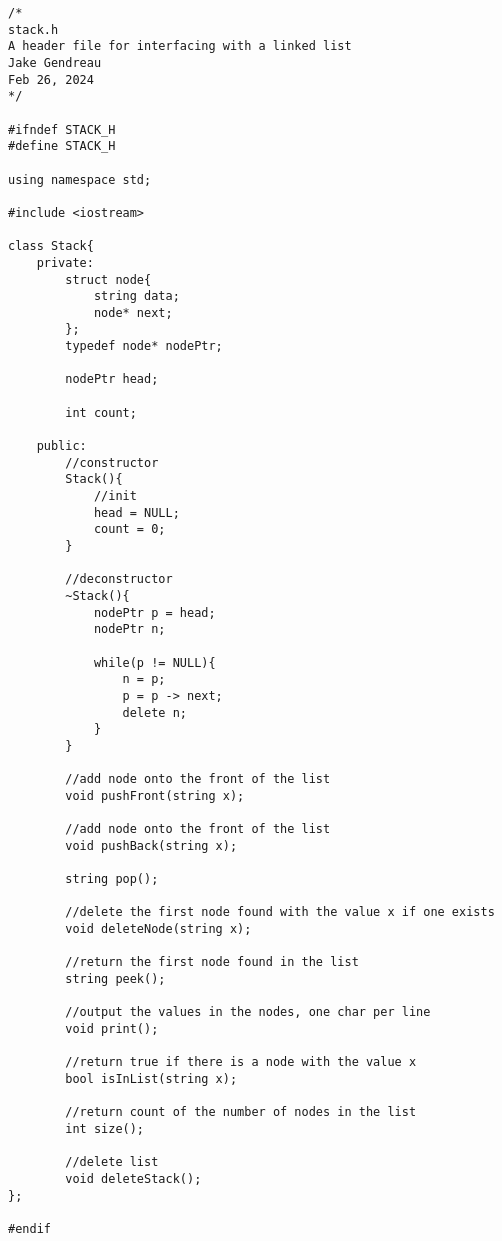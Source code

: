 
\begin{lstlisting}[style=cppstyle, caption={stackADT.h}]
/*
stack.h
A header file for interfacing with a linked list
Jake Gendreau
Feb 26, 2024
*/

#ifndef STACK_H
#define STACK_H

using namespace std;

#include <iostream>

class Stack{
    private:
        struct node{
            string data;
            node* next;
        };
        typedef node* nodePtr;

        nodePtr head;

        int count;

    public:
        //constructor
        Stack(){
            //init
            head = NULL;
            count = 0;
        }

        //deconstructor
        ~Stack(){
            nodePtr p = head;
            nodePtr n;

            while(p != NULL){
                n = p;
                p = p -> next;
                delete n;
            }
        }

        //add node onto the front of the list
        void pushFront(string x);

        //add node onto the front of the list
        void pushBack(string x);

        string pop();

        //delete the first node found with the value x if one exists
        void deleteNode(string x);

        //return the first node found in the list
        string peek();

        //output the values in the nodes, one char per line
        void print();

        //return true if there is a node with the value x
        bool isInList(string x);

        //return count of the number of nodes in the list
        int size();

        //delete list
        void deleteStack();
};

#endif

\end{lstlisting}
